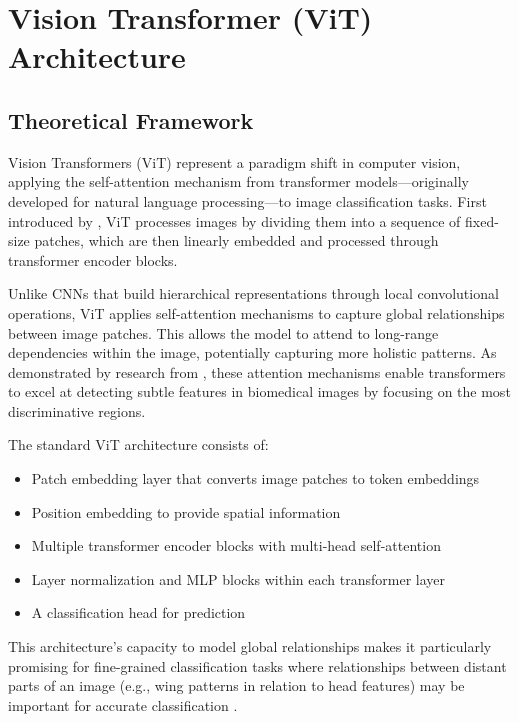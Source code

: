 \documentclass[a4paper,12pt]{article}
\begin{document}


\section{Vision Transformer (ViT) Architecture}

\subsection{Theoretical Framework}

Vision Transformers (ViT) represent a paradigm shift in computer vision, applying the self-attention mechanism from transformer models—originally developed for natural language processing—to image classification tasks. First introduced by \citep{dosovitskiy2020image}, ViT processes images by dividing them into a sequence of fixed-size patches, which are then linearly embedded and processed through transformer encoder blocks.

Unlike CNNs that build hierarchical representations through local convolutional operations, ViT applies self-attention mechanisms to capture global relationships between image patches. This allows the model to attend to long-range dependencies within the image, potentially capturing more holistic patterns. As demonstrated by research from \citep{liu2022attention}, these attention mechanisms enable transformers to excel at detecting subtle features in biomedical images by focusing on the most discriminative regions.

The standard ViT architecture consists of:

\begin{itemize}
    \item Patch embedding layer that converts image patches to token embeddings
    \item Position embedding to provide spatial information
    \item Multiple transformer encoder blocks with multi-head self-attention
    \item Layer normalization and MLP blocks within each transformer layer
    \item A classification head for prediction
\end{itemize}

This architecture's capacity to model global relationships makes it particularly promising for fine-grained classification tasks where relationships between distant parts of an image (e.g., wing patterns in relation to head features) may be important for accurate classification \citep{conde2021exploring}.
\end{document}
